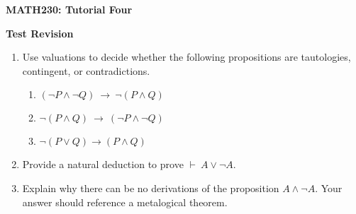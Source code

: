 \documentclass[11pt]{report}
\begin{document}
	
\begin{center}
	{\bf MATH230: Tutorial Four}
\end{center}
\begin{center}
	{\bf Test Revision}
\end{center}

\noindent{}
\newline
\vspace{0.5cm}


\begin{enumerate}
	\item Use valuations to decide whether the following propositions are tautologies, contingent, or contradictions.
		\begin{enumerate}
			\item $(\lnot P \land \lnot Q) \ \to \ \lnot(P \land Q)$ %
			\item $\lnot(P \land Q) \ \to \ (\lnot P \land \lnot Q)$ %
			\item  $\lnot(P \lor Q) \to (P \land Q)$%
		\end{enumerate}
	
	\vspace{4cm}

	\item Provide a natural deduction to prove $\vdash \ A \lor \lnot A$.
	
	\vspace{4cm}

	\item Explain why there can be no derivations of the proposition $A \land \lnot A$. Your answer should reference a metalogical theorem.
\end{enumerate}
\end{document}
